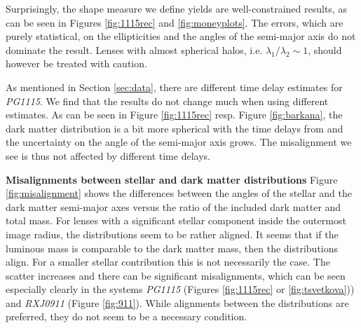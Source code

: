 \documentclass[useAMS,usenatbib]{mn2e}
\begin{document}
Surprisingly, the shape measure we define yields are well-constrained results, as can be seen in Figures \ref{fig:1115rec} and \ref{fig:moneyplots}. The errors, which are purely statistical, on the ellipticities and the angles of the semi-major axis do not dominate the result. Lenses with almost spherical halos, i.e. $\lambda_{1}/\lambda_{2}\sim1$, should however be treated with caution.

As mentioned in Section \ref{sec:data}, there are different time delay estimates for \textit{PG1115}. We find that the results do not change much when using different estimates. As can be seen in Figure \ref{fig:1115rec} resp. Figure \ref{fig:barkana}, the dark matter distribution is a bit more spherical with the time delays from \cite{2010MNRAS.406.2764T} and the uncertainty on the angle of the semi-major axis grows. The misalignment we see is thus not affected by different time delays.















\textbf{Misalignments between stellar and dark matter distributions}
Figure \ref{fig:misalignment} shows the differences between the angles of the stellar and the dark matter semi-major axes versus the ratio of the included dark matter and total mass. For lenses with a significant stellar component inside the outermost image radius, the distributions seem to be rather aligned. It seems that if the luminous mass is comparable to the dark matter mass, then the distributions align. For a smaller stellar contribution this is not necessarily the case. The scatter increases and there can be significant misalignments, which can be seen especially clearly in the systems \textit{PG1115} (Figures \ref{fig:1115rec} or \ref{fig:tsvetkova})) and \textit{RXJ0911} (Figure \ref{fig:911}). While alignments between the distributions are preferred, they do not seem to be a necessary condition.
\end{document}
